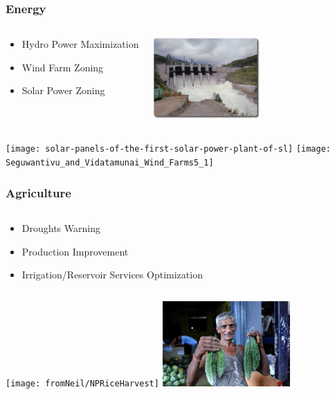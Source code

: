 \documentclass[serif,mathserif]{beamer}
\begin{document}
\begin{frame}
  \frametitle{Energy}
\begin{columns}
\begin{center}
\Large{
\begin{itemize}
 \item Hydro Power Maximization
 \item Wind Farm Zoning
 \item Solar Power Zoning
\end{itemize}
}
\end{center}

\begin{center}
 \includegraphics[width=4.1cm]{spilling_upper_Kotmale_Dam}
\end{center}
\end{columns}
\vspace{5mm}
\begin{center}
\texttt{[image: solar-panels-of-the-first-solar-power-plant-of-sl]}
\hspace{5mm}
\texttt{[image: Seguwantivu\_and\_Vidatamunai\_Wind\_Farms5\_1]}
\end{center}
\end{frame}

\begin{frame}
  \frametitle{Agriculture}
\begin{columns}
\begin{center}
\begin{itemize}
 \item Droughts Warning
 \item Production Improvement 
 \item Irrigation/Reservoir Services Optimization
\end{itemize}
\end{center}

\end{columns}
\vspace{5mm}
\begin{center}
 \texttt{[image: fromNeil/NPRiceHarvest]}
 \hspace{2mm}
 \includegraphics[height=3.25cm]{fromNeil/NP-Dambula}
\end{center}
\end{frame}
\end{document}
